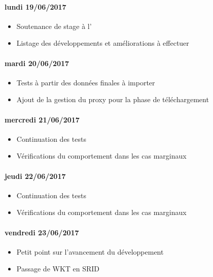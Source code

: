 \paragraph{lundi 19/06/2017}
\begin{itemize}
  \item Soutenance de stage à l'\iut
  \item Listage des développements et améliorations à effectuer
\end{itemize}

\paragraph{mardi 20/06/2017}
\begin{itemize}
  \item Tests à partir des données finales à importer
  \item Ajout de la gestion du proxy pour la phase de téléchargement
\end{itemize}

\paragraph{mercredi 21/06/2017}
\begin{itemize}
  \item Continuation des tests
  \item Vérifications du comportement dans les cas marginaux
\end{itemize}

\paragraph{jeudi 22/06/2017}
\begin{itemize}
  \item Continuation des tests
  \item Vérifications du comportement dans les cas marginaux
\end{itemize}

\paragraph{vendredi 23/06/2017}
\begin{itemize}
  \item Petit point sur l'avancement du développement
  \item Passage de WKT en SRID
\end{itemize}

\clearpage
